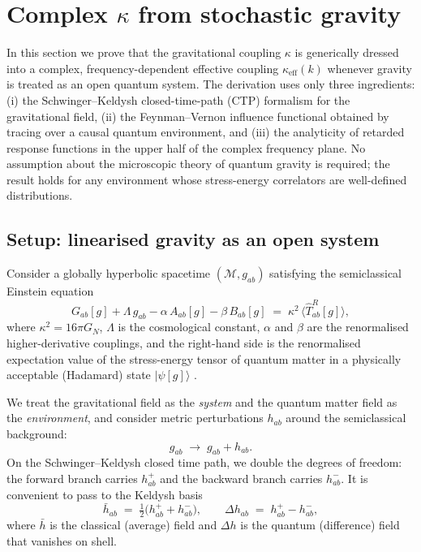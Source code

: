 \documentclass[12pt,a4paper]{article}
\begin{document}
\section{Complex $\kappa$ from stochastic gravity}\label{sec:complexkappa}

In this section we prove that the gravitational coupling $\kappa$ is generically dressed into a complex, frequency-dependent effective coupling $\kappa_{\mathrm{eff}}(k)$ whenever gravity is treated as an open quantum system.
The derivation uses only three ingredients: (i) the Schwinger--Keldysh closed-time-path (CTP) formalism for the gravitational field, (ii) the Feynman--Vernon influence functional obtained by tracing over a causal quantum environment, and (iii) the analyticity of retarded response functions in the upper half of the complex frequency plane.
No assumption about the microscopic theory of quantum gravity is required; the result holds for any environment whose stress-energy correlators are well-defined distributions.

\subsection{Setup: linearised gravity as an open system}\label{sec:setup}

Consider a globally hyperbolic spacetime $(\mathcal{M},g_{ab})$ satisfying the semiclassical Einstein equation
\begin{equation}\label{eq:SCE}
  G_{ab}[g] + \Lambda\, g_{ab} - \alpha\, A_{ab}[g] - \beta\, B_{ab}[g]
  \;=\; \kappa^{2}\,\bigl\langle\hat{T}^{R}_{ab}[g]\bigr\rangle,
\end{equation}
where $\kappa^{2}=16\pi G_{N}$, $\Lambda$ is the cosmological constant, $\alpha$ and $\beta$ are the renormalised higher-derivative couplings, and the right-hand side is the renormalised expectation value of the stress-energy tensor of quantum matter in a physically acceptable (Hadamard) state $|\psi[g]\rangle$ \cite{HuVerdaguer2008,HuVerdaguer2004,Wald1994}.

We treat the gravitational field as the \emph{system} and the quantum matter field as the \emph{environment}, and consider metric perturbations $h_{ab}$ around the semiclassical background:
\begin{equation}\label{eq:metricpert}
  g_{ab} \;\longrightarrow\; g_{ab} + h_{ab}.
\end{equation}
On the Schwinger--Keldysh closed time path, we double the degrees of freedom: the forward branch carries $h^{+}_{ab}$ and the backward branch carries $h^{-}_{ab}$.
It is convenient to pass to the Keldysh basis
\begin{equation}\label{eq:Keldysh}
  \bar{h}_{ab} \;=\; \tfrac{1}{2}\bigl(h^{+}_{ab}+h^{-}_{ab}\bigr), \qquad
  \Delta h_{ab} \;=\; h^{+}_{ab}-h^{-}_{ab},
\end{equation}
where $\bar{h}$ is the classical (average) field and $\Delta h$ is the quantum (difference) field that vanishes on shell.
\end{document}
